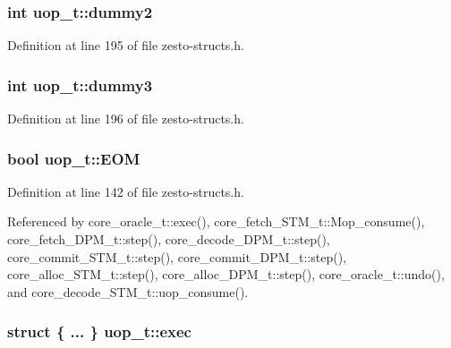 \subsubsection[{dummy2}]{\setlength{\rightskip}{0pt plus 5cm}int {\bf uop\_\-t::dummy2}}\label{structuop__t_db7362367b50842e95cffb2c3b074cf1}




Definition at line 195 of file zesto-structs.h.
\subsubsection[{dummy3}]{\setlength{\rightskip}{0pt plus 5cm}int {\bf uop\_\-t::dummy3}}\label{structuop__t_26c6f35bb18e314908452740209ac480}




Definition at line 196 of file zesto-structs.h.
\subsubsection[{EOM}]{\setlength{\rightskip}{0pt plus 5cm}bool {\bf uop\_\-t::EOM}}\label{structuop__t_be01a5d7b4a12d36d753ca8e295cceb6}




Definition at line 142 of file zesto-structs.h.

Referenced by core\_\-oracle\_\-t::exec(), core\_\-fetch\_\-STM\_\-t::Mop\_\-consume(), core\_\-fetch\_\-DPM\_\-t::step(), core\_\-decode\_\-DPM\_\-t::step(), core\_\-commit\_\-STM\_\-t::step(), core\_\-commit\_\-DPM\_\-t::step(), core\_\-alloc\_\-STM\_\-t::step(), core\_\-alloc\_\-DPM\_\-t::step(), core\_\-oracle\_\-t::undo(), and core\_\-decode\_\-STM\_\-t::uop\_\-consume().
\subsubsection[{exec}]{\setlength{\rightskip}{0pt plus 5cm}struct \{ ... \}   {\bf uop\_\-t::exec}}\label{structuop__t_effc0bd8baf056d9abde991743af3cc3}




